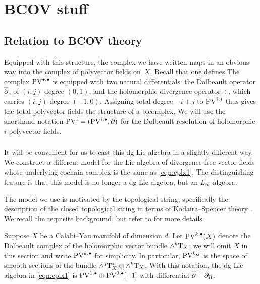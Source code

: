 \documentclass[11pt]{amsart}
\begin{document}
\appendix

\section{BCOV stuff}

\subsection{Relation to BCOV theory}

\parsec[sec:pv] 
Equipped with this structure, the complex we have written maps in an obvious way into the complex of polyvector fields on~$X$. Recall that one defines
The complex ${\rm PV}^{\bullet,\bullet}$ is equipped with two natural differentials: the Dolbeault operator $\overline{\partial}$, of $(i,j)$-degree $(0,1)$, and the holomorphic divergence operator $\div$, which carries $(i,j)$-degree $(-1,0)$. Assigning total degree $- i + j$ to ${\rm PV}^{i,j}$ thus gives the total polyvector fields the structure of a bicomplex. We will use the shorthand notation ${\rm PV}^i = ({\rm PV}^{i,\bullet}, \overline{\partial} )$ for the Dolbeault resolution of holomorphic $i$-polyvector fields. 

\subsubsection{}
It will be convenient for us to cast this dg Lie algebra in a slightly different way.
We construct a different model for the Lie algebra of divergence-free vector fields whose underlying cochain complex is the same as \eqref{eqn:cplx1}. 
The distinguishing feature is that this model is no longer a dg Lie algebra, but an $L_\infty$ algebra. 

The model we use is motivated by the topological string, specifically the description of the closed topological string in terms of Kodaira--Spencer theory \cite{BCOV}.
We recall the requisite background, but refer to \cite{CLbcov1,CLbcov2,CLtypeI} for more details. 

Suppose $X$ be a Calabi--Yau manifold of dimension $d$. 
Let ${\rm PV}^{k,\bullet}(X)$ denote the Dolbeault complex of the holomorphic vector bundle $\wedge^k {\rm T}_X$; we will omit $X$ in this section and write ${\rm PV}^{k,\bullet}$ for simplicity.
In particular, ${\rm PV}^{k,j}$ is the space of smooth sections of the bundle $\wedge^j {\rm T}_X^* \otimes \wedge^k {\rm T}_X$. 
With this notation, the dg Lie algebra in \eqref{eqn:cplx1} is ${\rm PV}^{1,\bullet} \oplus {\rm PV}^{0,\bullet}[-1]$ with differential $\overline{\partial} + \partial_{\Omega}$. 
\end{document}
